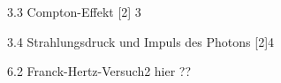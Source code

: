 3.3 Compton-Effekt [2] 3	

3.4 Strahlungsdruck und Impuls des Photons [2]4	

6.2 Franck-Hertz-Versuch2	hier ??









